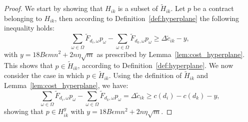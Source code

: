 	\begin{proof}
	We start by showing that $H_{ik}$ is a subset of $\widetilde{H}_{ik}$. Let $p$ be a contract belonging to $H_{ik}$, then according to Definition~\ref{def:hyperplane} the following inequality holds:
	\begin{equation*}
		\sum_{\omega \in \Omega}\widetilde{F}_{d_i,\omega}p_{\omega} -  \sum_{\omega \in \Omega}\widetilde{F}_{d_k,\omega}p_{\omega}  \ge  \Delta \widetilde{c}_{ik} - y,
	\end{equation*}
	with $y= 18 B \epsilon m n^2 + 2  n \eta \sqrt{m}$ as prescribed by Lemma~\ref{lem:cost_hyperplane}. This shows that $p\in\widetilde{H}_{ik}$, according to Definition~\ref{def:hyperplane}. We now consider the case in which $p\in\widetilde{H}_{ik}$. Using the definition of $\widetilde{H}_{ik}$ and Lemma~\ref{lem:cost_hyperplane}, we have:
	\begin{equation*}
		\sum_{\omega \in \Omega}\widetilde{F}_{d_i,\omega}p_{\omega} -  \sum_{\omega \in \Omega}\widetilde{F}_{d_k,\omega}p_{\omega}  = \Delta \widetilde{c}_{ik} \ge  c(d_i)- c(d_k) - y,
	\end{equation*}
	showing that $p\in{H}^y_{ik}$ with $y =18 B \epsilon m n^2 + 2  n \eta \sqrt{m}$.
	\end{proof}	

